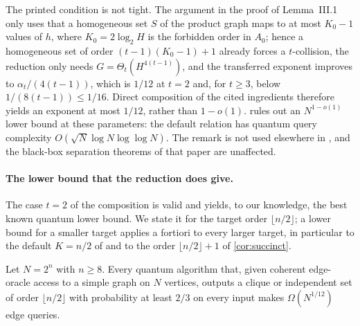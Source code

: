 The printed condition is not tight.  The argument in the proof of
Lemma~III.1 only uses that a homogeneous set $S$ of the product graph maps
to at most $K_0-1$ values of $h$, where $K_0=2\log_2H$ is the forbidden
order in $A_0$; hence a homogeneous set of order $(t-1)(K_0-1)+1$ already
forces a $t$-collision, the reduction only needs $G=\Theta_t(H^{4(t-1)})$,
and the transferred exponent improves to $\alpha_t/(4(t-1))$, which is
$1/12$ at $t=2$ and, for $t\ge3$, below $1/(8(t-1))\le1/16$.  Direct composition of the cited ingredients therefore yields an
exponent at most $1/12$, rather than $1-o(1)$.   rules out
an $N^{1-o(1)}$ lower bound at these parameters: the default relation has
quantum query complexity $O(\sqrt N\log N\log\log N)$.  The remark is not
used elsewhere in \cite{JainLiRobereXun2024}, and the black-box separation
theorems of that paper are unaffected.

\paragraph{The lower bound that the reduction does give.}
The case $t=2$ of the composition is valid and yields, to our knowledge,
the best known quantum lower bound.  We state it for the target order
$\lfloor n/2\rfloor$; a lower bound for a smaller target applies a fortiori
to every larger target, in particular to the default $K=n/2$ of
\cite{JainLiRobereXun2024} and to the order $\lfloor n/2\rfloor+1$ of
\cref{cor:succinct}.

\begin{proposition}
\label{prop:quantum-lower}
Let $N=2^n$ with $n\ge8$.  Every quantum algorithm that, given coherent
edge-oracle access to a simple graph on $N$ vertices, outputs a clique or
independent set of order $\lfloor n/2\rfloor$ with probability at least
$2/3$ on every input makes $\Omega(N^{1/12})$ edge queries.
\end{proposition}

